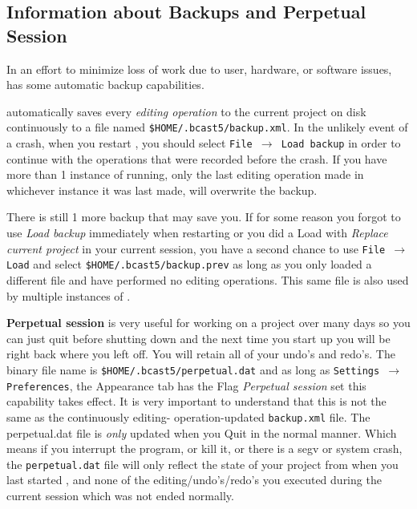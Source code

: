 \subsection{Information about Backups and Perpetual Session}%
\label{sub:information_backups_perpetual_session}

In an effort to minimize loss of work due to user, hardware, or software issues, \CGG{} has some automatic backup capabilities.

\CGG{} automatically saves every \textit{editing operation} to the current project on disk continuously to a file named \texttt{\$HOME/.bcast5/backup.xml}.  In the unlikely event of a crash, when you restart \CGG{}, you should select \texttt{File $\rightarrow$ Load backup} in order to continue with the operations that were recorded before the crash.  If you have more than 1 instance of \CGG{} running, only the last editing operation made in whichever instance it was last made, will overwrite the backup. 

There is still 1 more backup that may save you.  If for some reason you forgot to use \textit{Load backup}
immediately when restarting or you did a Load with \textit{Replace current project} in your current session,
you have a second chance to use \texttt{File $\rightarrow$ Load} and select \texttt{\$HOME/.bcast5/backup.prev}
as long as you only loaded a different file and have performed no editing operations.  This same file is also used by multiple instances of \CGG{}.

\textbf{Perpetual session} is very useful for working on a project over many days so you can just quit before shutting down and the next time you start up \CGG{} you will be right back where you left off.  
You will retain all of your undo’s and redo’s.  
The binary file name is \texttt{\$HOME/.bcast5/perpetual.dat} and as long as \texttt{Settings $\rightarrow$ Preferences}, the Appearance tab has the Flag \textit{Perpetual session} set this capability takes effect.  
It is very important to understand that this is not the same as the continuously editing- operation-updated \texttt{backup.xml} file.  
The perpetual.dat file is \textit{only} updated when you Quit \CGG{} in the normal manner.  
Which means if you interrupt the program, or kill it, or there is a segv or system crash, the \texttt{perpetual.dat} file will only reflect the state of your project from when you last started \CGG{}, and none of the editing/undo’s/redo’s you executed during the current session which was not ended normally.
\vspace{1ex}

